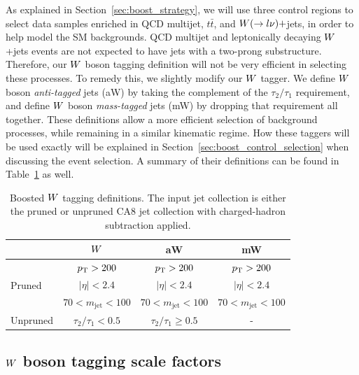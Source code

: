 As explained in Section~\ref{sec:boost_strategy}, we will use three control regions to select data
samples enriched in QCD multijet, $t\bar{t}$, and $W(\rightarrow l \nu)+$jets, in order to help
model the SM backgrounds. QCD multijet and leptonically decaying $W$+jets events are not expected
to have jets with a two-prong substructure. Therefore, our $W$ boson tagging definition will not be
very efficient in selecting these processes. To remedy this, we slightly modify our $W$ tagger. 
We define $W$ boson \textit{anti-tagged} jets (aW) by taking the complement of the $\tau_2 /
\tau_1$ requirement, and define $W$ boson \textit{mass-tagged} jets (mW) by dropping that
requirement all together. 
These definitions allow a more efficient selection of background processes, while remaining in a
similar kinematic regime. How these taggers will be used exactly will be explained in
Section~\ref{sec:boost_control_selection} when discussing the event selection. A summary of their
definitions can be found in Table~\ref{tab:Wtag_definition} as well. 

\begin{table}[htdp]
\caption{Boosted $W$ tagging definitions. The input jet collection is either the pruned or unpruned
CA8 jet collection with charged-hadron subtraction applied. }
\vspace{1ex}
\centering
\begin{tabular}{l c c c}
\toprule
& $W$ & aW & mW  \\
\midrule
\multirow{3}{*}{Pruned} & $p_{\mathrm{T}} > 200$  & $p_{\mathrm{T}} > 200$  & $p_{\mathrm{T}} > 200$\\
& $|\eta| < 2.4$ & $|\eta| < 2.4$ & $|\eta| < 2.4$\\
& $70 < m_{\textrm{jet}}< 100$ & $70 < m_{\textrm{jet}}< 100$ & $70 < m_{\textrm{jet}}< 100$\\
\midrule
Unpruned & $\tau_2 / \tau_1 < 0.5$ & $\tau_2 / \tau_1 \geq 0.5$ & -\\
\bottomrule
\end{tabular}
\label{tab:Wtag_definition}
\end{table}


\subsection{\texorpdfstring{$W$}{W} boson tagging scale factors \label{sec:wtag_scale_factor}}

